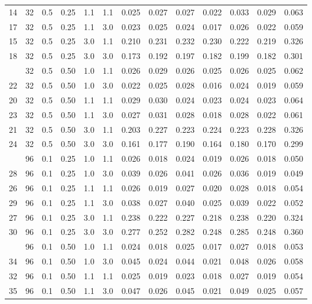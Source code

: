 \begin{longtable}[t]{ccccccrrrrrrc}
14 & 32 & 0.5 & 0.25 & 1.1 & 1.1 & 0.025 & 0.027 & 0.027 & 0.022 & 0.033 & 0.029 & 0.063\\
17 & 32 & 0.5 & 0.25 & 1.1 & 3.0 & 0.023 & 0.025 & 0.024 & 0.017 & 0.026 & 0.022 & 0.059\\
15 & 32 & 0.5 & 0.25 & 3.0 & 1.1 & 0.210 & 0.231 & 0.232 & 0.230 & 0.222 & 0.219 & 0.326\\
18 & 32 & 0.5 & 0.25 & 3.0 & 3.0 & 0.173 & 0.192 & 0.197 & 0.182 & 0.199 & 0.182 & 0.301\\
\addlinespace
19 & 32 & 0.5 & 0.50 & 1.0 & 1.1 & 0.026 & 0.029 & 0.026 & 0.025 & 0.026 & 0.025 & 0.062\\
22 & 32 & 0.5 & 0.50 & 1.0 & 3.0 & 0.022 & 0.025 & 0.028 & 0.016 & 0.024 & 0.019 & 0.059\\
20 & 32 & 0.5 & 0.50 & 1.1 & 1.1 & 0.029 & 0.030 & 0.024 & 0.023 & 0.024 & 0.023 & 0.064\\
23 & 32 & 0.5 & 0.50 & 1.1 & 3.0 & 0.027 & 0.031 & 0.028 & 0.018 & 0.028 & 0.022 & 0.061\\
21 & 32 & 0.5 & 0.50 & 3.0 & 1.1 & 0.203 & 0.227 & 0.223 & 0.224 & 0.223 & 0.228 & 0.326\\
24 & 32 & 0.5 & 0.50 & 3.0 & 3.0 & 0.161 & 0.177 & 0.190 & 0.164 & 0.180 & 0.170 & 0.299\\
\addlinespace
25 & 96 & 0.1 & 0.25 & 1.0 & 1.1 & 0.026 & 0.018 & 0.024 & 0.019 & 0.026 & 0.018 & 0.050\\
28 & 96 & 0.1 & 0.25 & 1.0 & 3.0 & 0.039 & 0.026 & 0.041 & 0.026 & 0.036 & 0.019 & 0.049\\
26 & 96 & 0.1 & 0.25 & 1.1 & 1.1 & 0.026 & 0.019 & 0.027 & 0.020 & 0.028 & 0.018 & 0.054\\
29 & 96 & 0.1 & 0.25 & 1.1 & 3.0 & 0.038 & 0.027 & 0.040 & 0.025 & 0.039 & 0.022 & 0.052\\
27 & 96 & 0.1 & 0.25 & 3.0 & 1.1 & 0.238 & 0.222 & 0.227 & 0.218 & 0.238 & 0.220 & 0.324\\
30 & 96 & 0.1 & 0.25 & 3.0 & 3.0 & 0.277 & 0.252 & 0.282 & 0.248 & 0.285 & 0.248 & 0.360\\
\addlinespace
31 & 96 & 0.1 & 0.50 & 1.0 & 1.1 & 0.024 & 0.018 & 0.025 & 0.017 & 0.027 & 0.018 & 0.053\\
34 & 96 & 0.1 & 0.50 & 1.0 & 3.0 & 0.045 & 0.024 & 0.044 & 0.021 & 0.048 & 0.026 & 0.058\\
32 & 96 & 0.1 & 0.50 & 1.1 & 1.1 & 0.025 & 0.019 & 0.023 & 0.018 & 0.027 & 0.019 & 0.054\\
35 & 96 & 0.1 & 0.50 & 1.1 & 3.0 & 0.047 & 0.026 & 0.045 & 0.021 & 0.049 & 0.025 & 0.057\\

\end{longtable}
